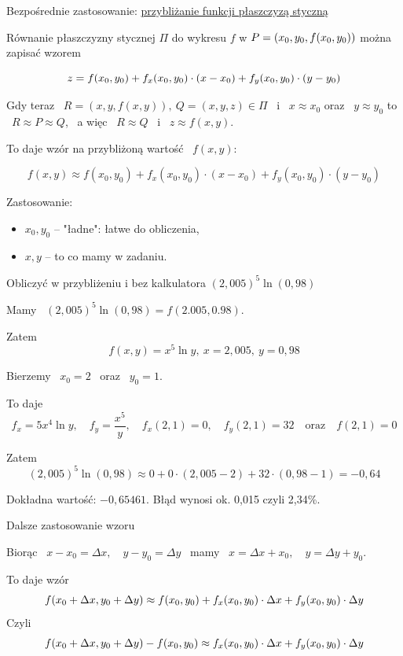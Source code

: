 Bezpośrednie zastosowanie: \underline{przybliżanie funkcji płaszczyzą styczną}

Równanie płaszczyzny stycznej $\Pi$ do wykresu $f$ w $P = (x_0, y_0, f(x_0, y_0))$ można zapisać wzorem

\[ z = f(x_0, y_0) + f_x(x_0, y_0) \cdot (x - x_0) + f_y(x_0, y_0) \cdot (y - y_0) \]

Gdy teraz \ $ R = (x, y, f(x,y)), \ Q = (x,y,z) \in \Pi $ \ i \ $ x \approx x_0 $ oraz \ $ y \approx y_0 $ to 
\ $ R \approx P \approx Q $, \ a więc \ $ R \approx Q $ \ i \ $ z \approx f(x,y) $.

To daje wzór na przybliżoną wartość \ $f(x,y)$:

\[ f(x,y) \approx f(x_0,y_0) + f_x(x_0, y_0) \cdot (x - x_0 ) + f_y(x_0, y_0) \cdot (y - y_0) \]

Zastosowanie:
\begin{itemize}
    \item $ x_0, y_0 $ -- "ładne": łatwe do obliczenia,
    \item $ x,y $ -- to co mamy w zadaniu.
\end{itemize}

\begin{przyklad}
    Obliczyć w przybliżeniu i bez kalkulatora $ (2,005)^5 \ln(0,98) $ \medskip

    Mamy \ $ (2,005)^5 \ln(0,98) = f(2.005, 0.98) $.

    Zatem
    \[ f(x,y) = x^5 \ln y, \ x = 2,005, \ y = 0,98 \]

    Bierzemy \ $x_0 = 2$ \ oraz \ $ y_0 = 1 $.

    To daje
    \[ f_x = 5x^4 \ln y, \quad f_y = \frac{x^5}{y}, \quad f_x(2,1) = 0, \quad f_y(2,1) = 32 \quad \text{oraz} \quad f(2,1) = 0 \]

    Zatem
    \[ (2,005)^5 \ln (0,98) \approx 0 + 0 \cdot (2,005 - 2) + 32 \cdot(0,98 - 1) = -0,64 \]

    Dokładna wartość: $ -0,65461 $. Błąd wynosi ok. 0,015 czyli 2,34\%.
\end{przyklad}

Dalsze zastosowanie wzoru

Biorąc \ $ x - x_0 = \Delta x, \quad y - y_0 = \Delta y $ \ mamy \ $ x = \Delta x + x_0, \quad y = \Delta y + y_0 $.
\medskip

To daje wzór
\[ f(x_0 + \Delta x, y_0 + \Delta y) \approx f(x_0, y_0) + f_x(x_0, y_0) \cdot \Delta x + f_y(x_0, y_0) \cdot \Delta y \]
Czyli
\[ f(x_0 + \Delta x, y_0 + \Delta y) - f(x_0, y_0) \approx f_x(x_0, y_0) \cdot \Delta x + f_y(x_0, y_0) \cdot \Delta y \]

